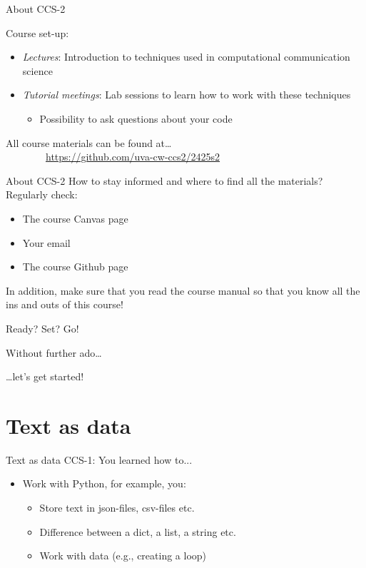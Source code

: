 \documentclass[handout]{beamer}
\begin{document}
\begin{frame}{About CCS-2} 
	
Course set-up:
\begin{itemize}[<+->]
	\item \emph{Lectures}: Introduction to techniques used in computational communication science
	\item \emph{Tutorial meetings}: Lab sessions to learn how to work with these techniques
	\begin{itemize}
		\item Possibility to ask questions about your code
	\end{itemize}
\end{itemize}

\end{frame}

\begin{frame} 
	All course materials can be found at\ldots \\
	~~~~~~~~\url{https://github.com/uva-cw-ccs2/2425s2}
\end{frame}

\begin{frame}{About CCS-2} 
How to stay informed and where to find all the materials? Regularly check:	
	\begin{itemize}
		\item The course Canvas page
		\item Your email
		\item The course Github page
	\end{itemize}
In addition, make sure that you read the course manual so that you know all the ins and outs of this course!
\end{frame}


\begin{frame}{Ready? Set? Go!} 
	
	Without further ado\dots
	
	\dots let's get started!
	
\end{frame}

\section{Text as data}

\begin{frame}{Text as data}
	CCS-1: You learned how to...
		\begin{itemize}
		\item Work with Python, for example, you:
		\begin{itemize}
			\item Store text in json-files, csv-files etc.
			\item Difference between a dict, a list, a string etc.
			\item Work with data (e.g., creating a loop)
		\end{itemize}
	\end{itemize}
	\end{frame}
\end{document}
